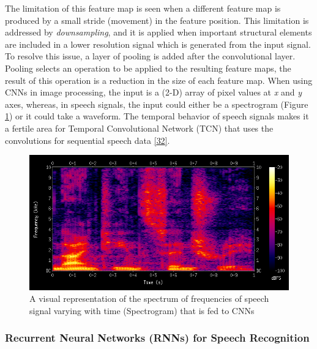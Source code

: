 \documentclass[
  a4paper,
]{article}
\begin{document}
The limitation of this feature map is seen when a different feature map
is produced by a small stride (movement) in the feature position. This
limitation is addressed by \emph{downsampling}, and it is applied when
important structural elements are included in a lower resolution signal
which is generated from the input signal. To resolve this issue, a layer
of pooling is added after the convolutional layer. Pooling selects an
operation to be applied to the resulting feature maps, the result of
this operation is a reduction in the size of each feature map. When
using CNNs in image processing, the input is a (2-D) array of pixel
values at \emph{x} and \emph{y} axes, whereas, in speech signals, the
input could either be a spectrogram (Figure \ref{fig:spectrogram}) or it
could take a waveform. The temporal behavior of speech signals makes it
a fertile area for Temporal Convolutional Network (TCN) that uses the
convolutions for sequential speech data
\protect\hyperlink{ref-lemaire2019temporal}{{[}32{]}}.

\begin{figure}

{\centering \includegraphics{spectrogram} 

}

\caption{A visual representation of the spectrum of frequencies of speech signal varying with time (Spectrogram) that is fed to CNNs}\label{fig:spectrogram}
\end{figure}

\hypertarget{recurrent-neural-networks-rnns-for-speech-recognition}{%
\subsubsection{Recurrent Neural Networks (RNNs) for Speech
Recognition}\label{recurrent-neural-networks-rnns-for-speech-recognition}}
\end{document}
